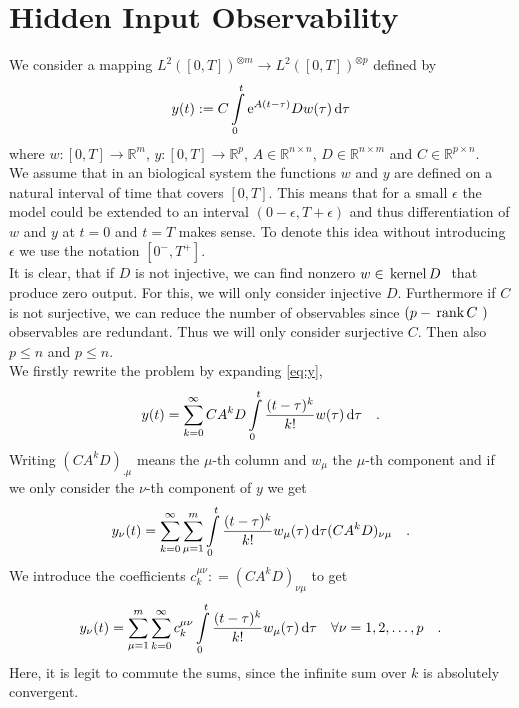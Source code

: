 \section{Hidden Input Observability}

We consider a mapping $L^2([0,T])^{\otimes m}\to L^2([0,T])^{\otimes p}$ defined by 
\begin{equation}
y(t) := C \int\limits_0^t \text{e}^{A(t-\tau)} D w(\tau) \, \text{d} \tau \label{eq:y}
\end{equation}
where $w:[0,T]\to \mathbb{R}^m$, $y:[0,T]\to \mathbb{R}^p$, $A\in\mathbb{R}^{n\times n}$, 
$D\in\mathbb{R}^{n\times m}$ and $C\in\mathbb{R}^{p\times n}$. \\

We assume that in an biological system the functions $w$ and $y$ are defined on 
a natural interval of time that covers $[0,T]$. This means that for a small $\epsilon$ the 
model could be extended to an interval $(0-\epsilon , T+\epsilon)$ and thus differentiation 
of $w$ and $y$ at $t=0$ and $t=T$ makes sense. To denote this idea without 
introducing $\epsilon$ we use the notation $[0^-,T^+]$.
\\

It is clear, that if $D$ is not injective, we can find nonzero $w\in \, \text{kernel}\,D \,\,$ that 
produce zero output. For this, we will only consider injective $D$. Furthermore if 
$C$ is not surjective, we can reduce the number of observables since $(p- \, \text{rank}\,C \,\, )$ 
observables are redundant. Thus we will only consider surjective $C$. Then also 
$p \leq n$ and  $p \leq n$.\\

We firstly rewrite the problem by expanding \eqref{eq:y}, 
\begin{equation}
y(t) = \sum\limits_{k=0}^\infty CA^kD \int\limits_0^t \frac{(t-\tau)^k}{k!} w(\tau) \, \text{d} 
\tau \quad .
\end{equation}
Writing $(CA^kD)_{.\mu}$ means the $\mu$-th column and $w_\mu$ the $\mu$-th component
and if we only consider the $\nu$-th component of $y$ we get 
\begin{equation}
y_\nu(t) = \sum\limits_{k=0}^\infty \sum\limits_{\mu=1}^m \int\limits_0^t 
\frac{(t-\tau)^k}{k!} w_\mu(\tau) \, \text{d} \tau (CA^kD)_{\nu\mu} \quad .
\end{equation}
We introduce the coefficients $c_k^{\mu\nu} : = (C A^k D)_{\nu\mu}$ to get
\begin{equation}
y_\nu(t) = \sum\limits_{\mu=1}^m \sum\limits_{k=0}^\infty  c_k^{\mu\nu}  \int\limits_0^t 
\frac{(t-\tau)^k}{k!} w_\mu(\tau) \,\text{d}\tau
\quad \forall \nu = 1,2,\ldots , p
 \quad . \label{eq:y_operator}
\end{equation}
Here, it is legit to commute the sums, since the infinite sum over $k$ is absolutely 
convergent.\\


